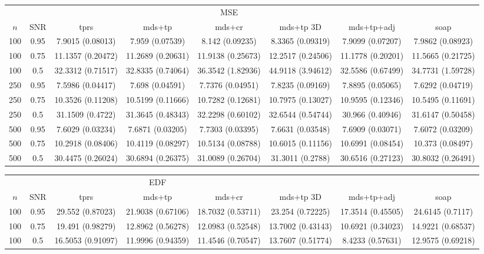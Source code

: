 {\begin{table}
\centering
\begin{tabular}{c c c c c c c c}
 & & &  & MSE  & & &\\ 
 $n$ & SNR & tprs & mds+tp & mds+cr & mds+tp 3D & mds+tp+adj & soap\\ 
\hline
100  &  0.95  & 7.9015 (0.08013) & 7.959 (0.07539) & 8.142 (0.09235) & 8.3365 (0.09319) & 7.9099 (0.07207) & 7.9862 (0.08923) \\ 
100  &  0.75  & 11.1357 (0.20472) & 11.2689 (0.20631) & 11.9138 (0.25673) & 12.2517 (0.24506) & 11.1778 (0.20201) & 11.5665 (0.21725) \\ 
100  &  0.5  & 32.3312 (0.71517) & 32.8335 (0.74064) & 36.3542 (1.82936) & 44.9118 (3.94612) & 32.5586 (0.67499) & 34.7731 (1.59728) \\ 
250  &  0.95  & 7.5986 (0.04417) & 7.698 (0.04591) & 7.7376 (0.04951) & 7.8235 (0.09169) & 7.8895 (0.05065) & 7.6292 (0.04719) \\ 
250  &  0.75  & 10.3526 (0.11208) & 10.5199 (0.11666) & 10.7282 (0.12681) & 10.7975 (0.13027) & 10.9595 (0.12346) & 10.5495 (0.11691) \\ 
250  &  0.5  & 31.1509 (0.4722) & 31.3645 (0.48343) & 32.2298 (0.60102) & 32.6544 (0.54744) & 30.966 (0.40946) & 31.6147 (0.50458) \\ 
500  &  0.95  & 7.6029 (0.03234) & 7.6871 (0.03205) & 7.7303 (0.03395) & 7.6631 (0.03548) & 7.6909 (0.03071) & 7.6072 (0.03209) \\ 
500  &  0.75  & 10.2918 (0.08406) & 10.4119 (0.08297) & 10.5134 (0.08788) & 10.6015 (0.11156) & 10.6991 (0.08454) & 10.373 (0.08497) \\ 
500  &  0.5  & 30.4475 (0.26024) & 30.6894 (0.26375) & 31.0089 (0.26704) & 31.3011 (0.2788) & 30.6516 (0.27123) & 30.8032 (0.26491) \\ 
\end{tabular}
\begin{tabular}{c c c c c c c c}
 & &  & EDF  & & &\\ 
$n$ & SNR & tprs & mds+tp & mds+cr & mds+tp 3D & mds+tp+adj & soap\\ 
\hline
100  &  0.95  & 29.552 (0.87023) & 21.9038 (0.67106) & 18.7032 (0.53711) & 23.254 (0.72225) & 17.3514 (0.45505) & 24.6145 (0.7117) \\ 
100  &  0.75  & 19.491 (0.98279) & 12.8962 (0.56278) & 12.0983 (0.52548) & 13.7002 (0.43143) & 10.6921 (0.34023) & 14.9221 (0.68537) \\ 
100  &  0.5  & 16.5053 (0.91097) & 11.9996 (0.94359) & 11.4546 (0.70547) & 13.7607 (0.51774) & 8.4233 (0.57631) & 12.9575 (0.69218) \\ 

\end{tabular}
\end{table}}
